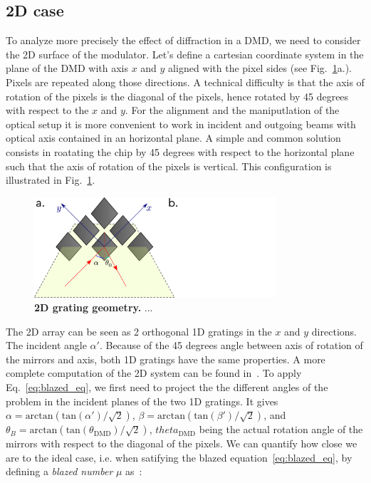 \documentclass[12pt]{iopart}
\begin{document}

\subsection{2D case}

To analyze more precisely the effect of diffraction in a DMD, 
we need to consider the 2D surface of the modulator.
Let's define a cartesian coordinate system in the plane of the DMD
with axis $x$ and $y$ aligned with the pixel sides 
(see Fig.~\ref{fig:2d_geom}a.). 
Pixels are repeated along those directions. 
A technical difficulty is that the axis of rotation of the pixels 
is the diagonal of the pixels, 
hence rotated by 45 degrees with respect to the $x$ and $y$. 
For the alignment and the maniputlation of the optical setup
it is more convenient to work in incident and outgoing beams 
with optical axis contained in an horizontal plane. 
A simple and common solution consists in roatating the chip by 45 degrees
with respect to the horizontal plane 
such that the axis of rotation of the pixels is vertical.  
This configuration is illustrated in Fig.~\ref{fig:2d_geom}.


\begin{figure}
  \centering
  \includegraphics[width = 0.8\textwidth]{images/dmd_45.pdf}
  \caption{
  \textbf{2D grating geometry.}
 ...
  }
  \label{fig:2d_geom}
\end{figure}

The 2D array can be seen as 2 orthogonal 1D gratings in the $x$ and $y$ directions.
The incident angle $\alpha'$. 
Because of the 45 degrees angle between 
axis of rotation of the mirrors and axis, 
both 1D gratings have the same properties. 
A more complete computation of the 2D system can be found in~\cite{Scholes2019structured}.
To apply Eq.~\ref{eq:blazed_eq}, 
we first need to project the 
the different angles of the problem in the incident planes 
of the two 1D gratings.
It gives 
$\alpha = \text{arctan}\left(\text{tan}(\alpha')/\sqrt{2}\right)$, 
$\beta = \text{arctan}\left(\text{tan}(\beta')/\sqrt{2}\right)$, 
and $\theta_B = \text{arctan}\left(\text{tan}(\theta_\text{DMD})/\sqrt{2}\right)$, 
$theta_\text{DMD}$ being the actual rotation angle of the mirrors with respect to the diagonal of the pixels.
We can quantify how close we are to the ideal case, 
i.e. when satifying the blazed equation~\ref{eq:blazed_eq}, 
by defining a {\em blazed number} $\mu$ as~\cite{WFSnet_diffraction}:
\end{document}
